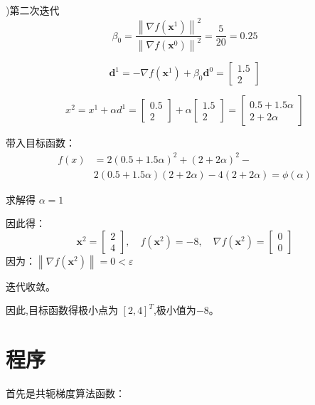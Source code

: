 \documentclass[10pt, a4paper,UTF8]{article}
\begin{document}
\par
{})第二次迭代
$$ \beta_{0}=\frac{\left\|\nabla f\left(\boldsymbol{x}^{1}\right)\right\|^{2}}{\left\|\nabla f\left(\boldsymbol{x}^{0}\right)\right\|^{2}}=\frac{5}{20}=0.25 $$

$$ \boldsymbol{d}^{1}=-\nabla f\left(\boldsymbol{x}^{1}\right)+\beta_{0} \boldsymbol{d}^{0}=\left[\begin{array}{c}{1.5} \\ {2}\end{array}\right] $$

$$ x^{2}=x^{1}+\alpha d^{1}=\left[\begin{array}{c}{0.5} \\ {2}\end{array}\right]+\alpha\left[\begin{array}{c}{1.5} \\ {2}\end{array}\right]=\left[\begin{array}{c}{0.5+1.5 \alpha} \\ {2+2 \alpha}\end{array}\right] $$

\qquad 带入目标函数：
$$ \begin{aligned} f(x) &=2(0.5+1.5 \alpha)^{2}+(2+2 \alpha)^{2}-\\ & 2(0.5+1.5 \alpha)(2+2 \alpha)-4(2+2 \alpha)=\phi(\alpha) \end{aligned}  $$

\qquad 求解得 $\alpha = 1$
\par
\qquad 因此得：
$$ \boldsymbol{x}^{2}=\left[\begin{array}{l}{2} \\ {4}\end{array}\right], \quad f\left(\boldsymbol{x}^{2}\right)=-8, \quad \nabla f\left(\boldsymbol{x}^{2}\right)=\left[\begin{array}{l}{0} \\ {0}\end{array}\right] $$
\qquad 因为：$ \left\|\nabla f\left(\boldsymbol{x}^{2}\right)\right\|=0<\varepsilon $
\par
\qquad 迭代收敛。
\par
\qquad 因此,目标函数得极小点为 $[2, 4]^T$,极小值为$-8$。

\section{程序}

首先是共轭梯度算法函数：
\end{document}
